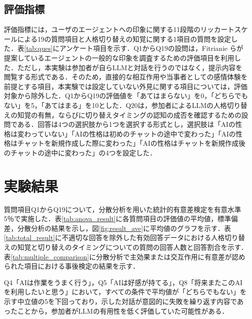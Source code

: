 \documentclass[10pt,twocolumn]{jsarticle}
\begin{document}
\subsection{評価指標}
評価指標には，ユーザのエージェントへの印象に関する11段階のリッカートスケールによる19の質問項目と人格切り替えの知覚に関する1項目の質問を設定した．表\ref{tab:ques}にアンケート項目を示す．Q1からQ19の設問は，Fitrianie ら\cite{Fitrianie2022,Fitrianie2025}が提案しているエージェントの一般的な印象を調査するための評価項目を利用した．ただし，本実験は参加者が自らLLMと対話を行うのではなく，提示内容を閲覧する形式である．そのため，直接的な相互作用や当事者としての感情体験を前提とする項目，本実験では設定していない外見に関する項目については，評価対象から除外した．Q1からQ19の評価値を「あてはまらない」を0，「どちらでもない」を5，「あてはまる」を10とした．Q20は，参加者によるLLMの人格切り替えの知覚の有無，ならびに切り替えタイミングの認知の成否を確認するための設問である．回答は4つの選択肢から1つを選択する形式とし，選択肢は「AIの性格は変わっていない」「AIの性格は初めのチャットの途中で変わった」「AIの性格はチャットを新規作成した際に変わった」「AIの性格はチャットを新規作成後のチャットの途中に変わった」の4つを設定した．




\section{実験結果}
質問項目Q1からQ19について，分散分析を用いた統計的有意差検定を有意水準5％で実施した．表\ref{tab:anova_result}に各質問項目の評価値の平均値，標準偏差，分散分析の結果を示し，図\ref{fig:result_ave}に平均値のグラフを示す．表\ref{tab:total_result}に不適切な回答を除外した有効回答データにおける人格切り替えの知覚と切り替えのタイミングについての質問の回答人数と回答割合を示す．表\ref{tab:multiple_comparison}に分散分析で主効果または交互作用に有意差が認められた項目における事後検定の結果を示す．

Q4「AIは作業をうまく行う」，Q5「AIは好感が持てる」，Q8「将来またこのAIを利用したいと思う」において，すべての条件で平均値が「どちらでもない」を示す中立値の5を下回っており，示した対話が意図的に失敗を繰り返す内容であったことから，参加者がLLMの有用性を低く評価していた可能性がある．
\end{document}
